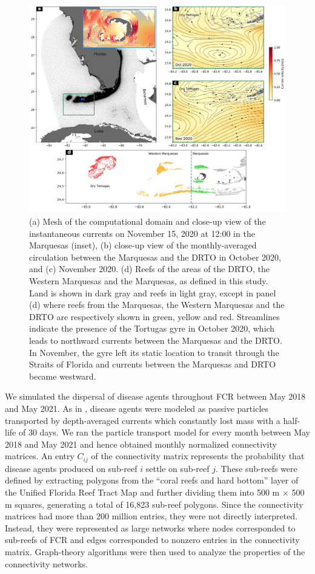 \begin{figure}
    \centering
    \includegraphics[width=.95\textwidth]{chapters/drto/figures/fig1.jpg}
    \caption{(a) Mesh of the computational domain and close-up view of the instantaneous currents on November 15, 2020 at 12:00 in the Marquesas (inset), (b) close-up view of the monthly-averaged circulation between the Marquesas and the DRTO in October 2020, and (c) November 2020. (d) Reefs of the areas of the DRTO, the Western Marquesas and the Marquesas, as defined in this study. Land is shown in dark gray and reefs in light gray, except in panel (d) where reefs from the Marquesas, the Western Marquesas and the DRTO are respectively shown in green, yellow and red. Streamlines indicate the presence of the Tortugas gyre in October 2020, which leads to northward currents between the Marquesas and the DRTO. In November, the gyre left its static location to transit through the Straits of Florida and currents between the Marquesas and DRTO became westward.}
    \label{fig:fig1_drto}
\end{figure}

We simulated the dispersal of disease agents throughout FCR between May 2018 and May 2021. As in \cite{dobbelaere2020coupled}, disease agents were modeled as passive particles transported by depth-averaged currents which constantly lost mass with a half-life of 30 days. We ran the particle transport model for every month between May 2018 and May 2021 and hence obtained monthly normalized connectivity matrices. An entry $C_{ij}$ of the connectivity matrix represents the probability that disease agents produced on sub-reef $i$ settle on sub-reef $j$. These sub-reefs were defined by extracting polygons from the “coral reefs and hard bottom” layer of the Unified Florida Reef Tract Map \citep{fwc2017unified} and further dividing them into 500 m $\times$ 500 m squares, generating a total of 16,823 sub-reef polygons. Since the connectivity matrices had more than 200 million entries, they were not directly interpreted. Instead, they were represented as large networks where nodes corresponded to sub-reefs of FCR and edges corresponded to nonzero entries in the connectivity matrix. Graph-theory algorithms were then used to analyze the properties of the connectivity networks. 

